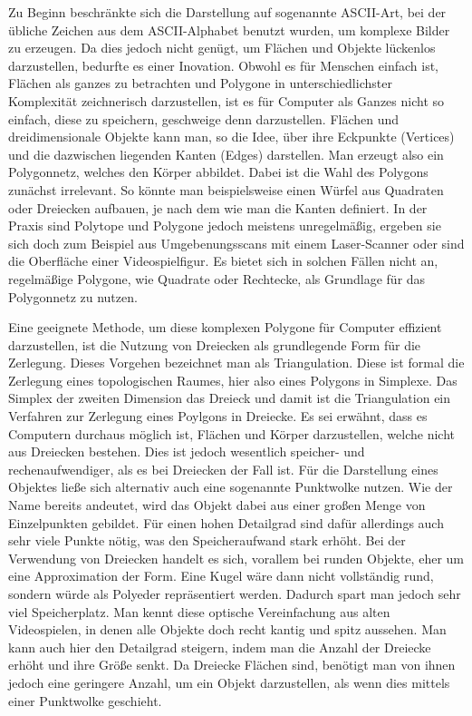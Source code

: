 \documentclass[12pt, twoside]{article}
\begin{document}
\begin{onehalfspacing}
  Zu Beginn beschränkte sich die Darstellung auf sogenannte ASCII-Art, bei der übliche Zeichen aus dem ASCII-Alphabet benutzt wurden, um komplexe Bilder zu erzeugen.
  Da dies jedoch nicht genügt, um Flächen und Objekte lückenlos darzustellen, bedurfte es einer Inovation. Obwohl es für Menschen einfach ist, Flächen als ganzes zu betrachten und
  Polygone in unterschiedlichster Komplexität zeichnerisch darzustellen, ist es für Computer als Ganzes nicht so einfach, diese zu speichern, geschweige denn darzustellen.
  Flächen und dreidimensionale Objekte kann man, so die Idee, über ihre Eckpunkte (Vertices) und die dazwischen liegenden Kanten (Edges) darstellen. 
  Man erzeugt also ein Polygonnetz, welches den Körper abbildet. Dabei ist die Wahl des Polygons zunächst irrelevant. So könnte man 
  beispielsweise einen Würfel aus Quadraten oder Dreiecken aufbauen, je nach dem wie man die Kanten definiert.\cite{polynet}
  In der Praxis sind Polytope und Polygone jedoch meistens unregelmäßig, ergeben sie sich doch zum Beispiel aus Umgebenungsscans mit einem Laser-Scanner oder sind die Oberfläche einer Videospielfigur.
  Es bietet sich in solchen Fällen nicht an, regelmäßige Polygone, wie Quadrate oder Rechtecke, als Grundlage für das Polygonnetz zu nutzen.
  
  Eine geeignete Methode, um diese komplexen Polygone für Computer effizient darzustellen, ist die Nutzung von Dreiecken als grundlegende Form für die Zerlegung.
  Dieses Vorgehen bezeichnet man als Triangulation. Diese ist formal die Zerlegung eines topologischen Raumes, hier also eines Polygons in Simplexe. Das Simplex der zweiten Dimension das Dreieck und damit ist die Triangulation
  ein Verfahren zur Zerlegung eines Poylgons in Dreiecke.
  Es sei erwähnt, dass es Computern durchaus möglich ist, Flächen und Körper darzustellen, welche nicht aus Dreiecken bestehen. Dies ist jedoch wesentlich speicher- und rechenaufwendiger, als es bei
  Dreiecken der Fall ist. Für die Darstellung eines Objektes ließe sich alternativ auch eine sogenannte Punktwolke nutzen. Wie der Name bereits andeutet, wird das Objekt dabei aus einer großen Menge
  von Einzelpunkten gebildet. Für einen hohen Detailgrad sind dafür allerdings auch sehr viele Punkte nötig, was den Speicheraufwand stark erhöht. Bei der Verwendung von Dreiecken handelt es sich, vorallem
  bei runden Objekte, eher um eine Approximation der Form. Eine Kugel wäre dann nicht vollständig rund, sondern würde als Polyeder repräsentiert werden. Dadurch spart man jedoch sehr viel Speicherplatz.
  Man kennt diese optische Vereinfachung aus alten Videospielen, in denen alle Objekte doch recht kantig und spitz aussehen. Man kann auch hier den Detailgrad steigern, indem man die Anzahl
  der Dreiecke erhöht und ihre Größe senkt. Da Dreiecke Flächen sind, benötigt man von ihnen jedoch eine geringere Anzahl, um ein Objekt darzustellen, als wenn dies mittels einer Punktwolke geschieht.
  

\end{onehalfspacing}
\end{document}
